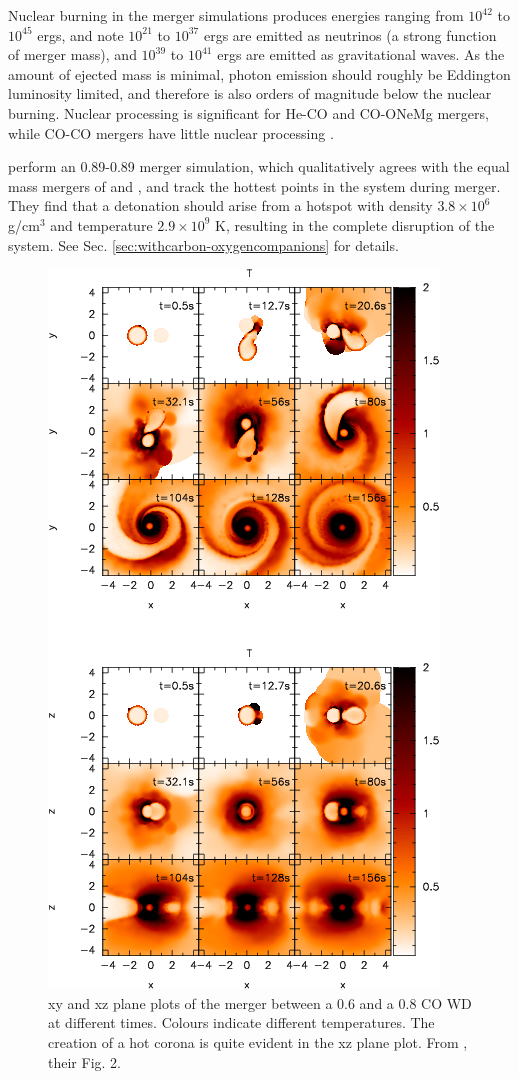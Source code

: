 Nuclear burning in the merger simulations produces energies ranging from $10^{42}$ to $10^{45}$ ergs, and \citeauthor{loreig09} note $10^{21}$ to $10^{37}$ ergs are emitted as neutrinos (a strong function of merger mass), and $10^{39}$ to $10^{41}$ ergs are emitted as gravitational waves.  As the amount of ejected mass is minimal, photon emission should roughly be Eddington luminosity limited, and therefore is also orders of magnitude below the nuclear burning.  Nuclear processing is significant for He-CO and CO-ONeMg mergers, while CO-CO mergers have little nuclear processing \citep{loreig09}.

\cite{pakm+10} perform an 0.89-0.89 merger simulation, which qualitatively agrees with the equal mass mergers of \citeauthor{loreig09} and \citeauthor{guerig04}, and track the hottest points in the system during merger.  They find that a detonation should arise from a hotspot with density $3.8 \times 10^6$ g/cm$^3$ and temperature $2.9 \times 10^9$ K, resulting in the complete disruption of the system.  See Sec. \ref{sec:withcarbon-oxygencompanions} for details.

\begin{figure}
\centerline{\includegraphics[width=0.6\hsize]{mergerfig.png}}
\caption{xy and xz plane plots of the merger between a 0.6 and a 0.8 {\Msun} CO WD at different times.  Colours indicate different temperatures.  The creation of a hot corona is quite evident in the xz plane plot.  From \cite{loreig09}, their Fig. 2.}
\label{mergerfig}
\end{figure}


